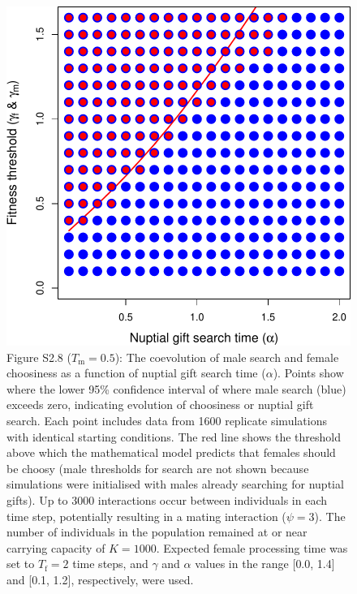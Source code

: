 \documentclass[
]{article}
\begin{document}
\captionsetup{labelformat=default}

\clearpage

\captionsetup{labelformat=empty}

\begin{figure}
\centering
\includegraphics{ms_biorxiv_files/figure-latex/unnamed-chunk-13-1.pdf}
\caption{Figure S2.8 (\(T_{\mathrm{m}} = 0.5\)): The coevolution of male
search and female choosiness as a function of nuptial gift search time
(\(\alpha\)). Points show where the lower 95\% confidence interval of
where male search (blue) exceeds zero, indicating evolution of
choosiness or nuptial gift search. Each point includes data from 1600
replicate simulations with identical starting conditions. The red line
shows the threshold above which the mathematical model predicts that
females should be choosy (male thresholds for search are not shown
because simulations were initialised with males already searching for
nuptial gifts). Up to 3000 interactions occur between individuals in
each time step, potentially resulting in a mating interaction
(\(\psi = 3\)). The number of individuals in the population remained at
or near carrying capacity of \(K = 1000\). Expected female processing
time was set to \(T_{\mathrm{f}}=2\) time steps, and \(\gamma\) and
\(\alpha\) values in the range {[}0.0, 1.4{]} and {[}0.1, 1.2{]},
respectively, were used.}
\end{figure}
\end{document}
